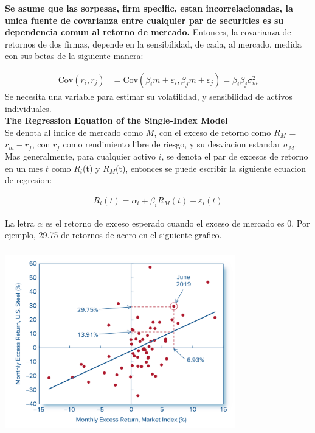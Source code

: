 \documentclass{article}
\begin{document}
\textbf{Se asume que las sorpesas, firm specific, estan incorrelacionadas, la unica fuente de covarianza entre cualquier par de securities es
su dependencia comun al retorno de mercado.} Entonces, la covarianza de retornos de dos firmas, depende en la sensibilidad, de cada, al mercado,
medida con sus betas de la siguiente manera:

\[
\begin{aligned}
\mathrm{Cov}(r_i, r_j) &= \mathrm{Cov}(\beta_i m + \varepsilon_i, \beta_j m + \varepsilon_j) = \beta_i \beta_j \sigma_m^2
\end{aligned}
\]
Se necesita una variable para estimar su volatilidad, y sensibilidad de activos individuales.
\\

\textbf{The Regression Equation of the Single-Index Model}
\\

Se denota al indice de mercado como $M$, con el exceso de retorno como $R_M$ = $r_m - r_f$, con $r_f$ como rendimiento libre de riesgo, y su desviacion estandar $\sigma_M$. Mas generalmente,
para cualquier activo $i$, se denota el par de excesos de retorno en un mes $t$ como $R_i$(t) y $R_M$(t), entonces se puede escribir la siguiente
ecuacion de regresion:

\[
\begin{aligned}
R_i(t) = \alpha_i + \beta_i R_M(t) + \varepsilon_i (t)
\end{aligned}
\]


La letra $\alpha$ es el retorno de exceso esperado cuando el exceso de mercado es 0. Por ejemplo, 29.75 de retornos de acero en el siguiente grafico.

\includegraphics[width=10cm, height=8cm]{./img/8_figura_excesos.png}
\end{document}
